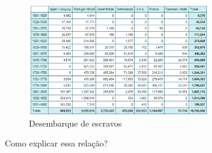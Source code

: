 \documentclass[a4paper,12pt]{article}[abntex2]
\begin{document}
\begin{figure}[H]
    \centering
    \includegraphics[width=0.7\textwidth]{Imagens Slides/i2a7.png}
    \caption{Desembarque de escravos}
\end{figure}

Como explicar essa relação? 
\end{document}
